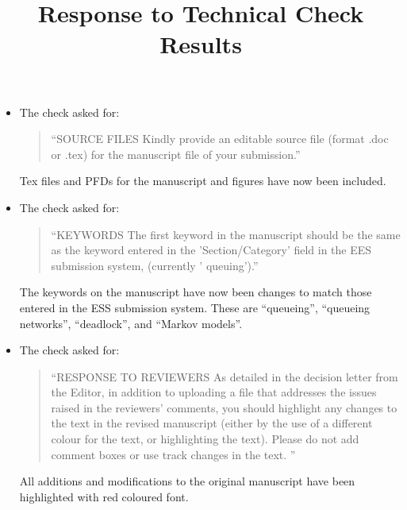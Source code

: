 \documentclass{article}
\title{Response to Technical Check Results}
\author{}
\date{}
\begin{document}
\maketitle

\begin{itemize}

\item The check asked for:
\begin{quote}
``SOURCE FILES
Kindly provide an editable source file (format .doc or .tex)  for the manuscript file of your submission.''
\end{quote}
Tex files and PFDs for the manuscript and figures have now been included.

\item The check asked for:
\begin{quote}
``KEYWORDS
The first keyword in the manuscript should be the same as the keyword entered in the 'Section/Category' field in the EES submission system, (currently ' queuing').''
\end{quote}
The keywords on the manuscript have now been changes to match those entered in the ESS submission system.
These are ``queueing'', ``queueing networks'', ``deadlock'', and ``Markov models''.


\item The check asked for:
\begin{quote}
``RESPONSE TO REVIEWERS
As detailed in the decision letter from the Editor, in addition to uploading a file that addresses the issues raised in the reviewers' comments, you should highlight any changes to the text in the revised manuscript (either by the use of a different colour for the text, or highlighting the text). Please do not add comment boxes or use track changes in the text. ''
\end{quote}
All additions and modifications to the original manuscript have been highlighted with red coloured font.


\end{itemize}
\end{document}
